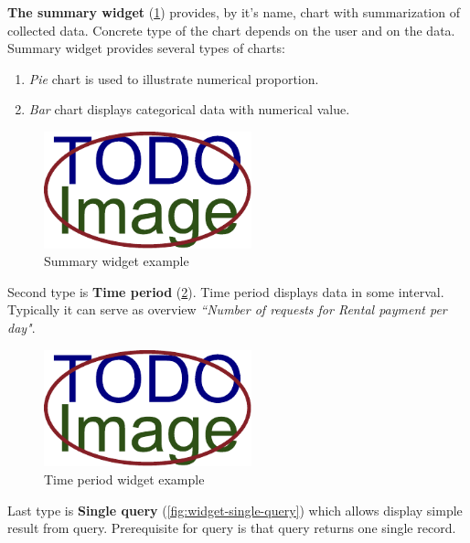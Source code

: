      \textbf{The summary widget} (\cref{fig:widget-summary}) provides, by it's name, chart with summarization of collected data. Concrete type of the chart depends on the user and on the data. Summary widget provides several types of charts:
     
     \begin{enumerate}
    	\item \textit{Pie} chart is used to illustrate numerical proportion.         
        \item  \textit{Bar} chart displays categorical data with numerical value.
    \end{enumerate}
      
      \begin{figure}[ht!]
          \centering
          \includegraphics[width=6cm,keepaspectratio]{img/TODO-image}
          \caption{Summary widget example}
          \label{fig:widget-summary}
      \end{figure}   
    
   	Second type is \textbf{Time period} (\cref{fig:widget-time-period}). Time period displays data in some interval. Typically it can serve as overview \textit{``Number of requests for Rental payment per day"}.        
      
      \begin{figure}[ht!]
          \centering
          \includegraphics[width=6cm,keepaspectratio]{img/TODO-image}
          \caption{Time period widget example}
          \label{fig:widget-time-period}
      \end{figure}
    
    Last type is \textbf{Single query} (\cref{fig:widget-single-query}) which allows display simple result from query. Prerequisite for query is that query returns one single record. 
      
